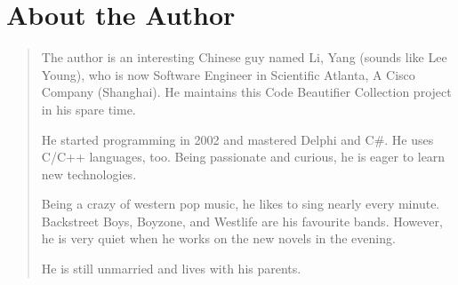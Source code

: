 \chapter*{About the Author}
\begin{quote}

The author is an interesting Chinese guy named Li, Yang (sounds like Lee
Young), who is now Software Engineer in Scientific Atlanta, A Cisco Company
(Shanghai). He maintains this Code Beautifier Collection project in his spare
time.

He started programming in 2002 and mastered Delphi and C\#. He uses
C/\-C++ languages, too. Being passionate and curious, he is eager to learn new
technologies.

Being a crazy of western pop music, he likes to sing nearly every minute.
Backstreet Boys, Boyzone, and Westlife are his favourite bands. However, he is
very quiet when he works on the new novels in the evening.

He is still unmarried and lives with his parents.
\end{quote}


